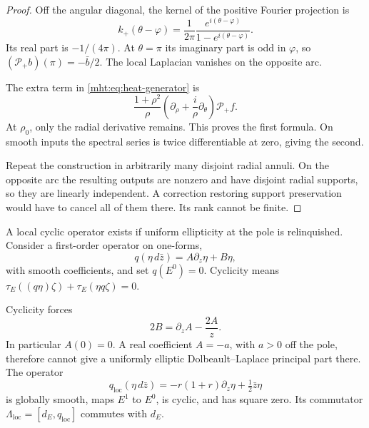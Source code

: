 \begin{proof}
Off the angular diagonal, the kernel of the positive Fourier
projection is
\[
 k_+(\theta-\varphi)=\frac1{2\pi}
       \frac{e^{i(\theta-\varphi)}}{1-e^{i(\theta-\varphi)}}.
\]
Its real part is $-1/(4\pi)$. At $\theta=\pi$ its imaginary
part is odd in $\varphi$, so
$(\mathcal P_+b)(\pi)=-\bar b/2$. The local Laplacian vanishes
on the opposite arc.

The extra term in
\eqref{mht:eq:heat-generator} is
\[
 \frac{1+\rho^2}{\rho}
   \left(\partial_\rho+\frac{i}{\rho}\partial_\theta\right)
   \mathcal P_+f.
\]
At $\rho_0$, only the radial derivative remains. This proves
the first formula. On smooth inputs the spectral series is
twice differentiable at zero, giving the second.

Repeat the construction in arbitrarily many disjoint radial
annuli. On the opposite arc the resulting outputs are nonzero
and have disjoint radial supports, so they are linearly
independent. A correction restoring support preservation would
have to cancel all of them there. Its rank cannot be finite.
\end{proof}

A local cyclic operator exists if uniform ellipticity at the
pole is relinquished. Consider a first-order operator on
one-forms,
\[
 q(\eta\,d\bar z)=A\partial_z\eta+B\eta,
\]
with smooth coefficients, and set $q(E^0)=0$. Cyclicity means
$\tau_E((q\eta)\zeta)+\tau_E(\eta q\zeta)=0$.

\begin{proposition}\label{mht:prop:local-polar-gauge}
Cyclicity forces
\begin{equation}\label{mht:eq:local-cyclic-coefficients}
 2B=\partial_zA-\frac{2A}{z}.
\end{equation}
In particular $A(0)=0$. A real coefficient $A=-a$, with $a>0$
off the pole, therefore cannot give a uniformly elliptic
Dolbeault--Laplace principal part there.
The operator
\begin{equation}\label{mht:eq:local-polar-gauge}
 q_{\mathrm{loc}}(\eta\,d\bar z)
   =-r(1+r)\partial_z\eta+\tfrac12\bar z\eta
\end{equation}
is globally smooth, maps $E^1$ to $E^0$, is cyclic, and has
square zero. Its commutator
$\Lambda_{\mathrm{loc}}=[d_E,q_{\mathrm{loc}}]$ commutes with $d_E$.
\end{proposition}

